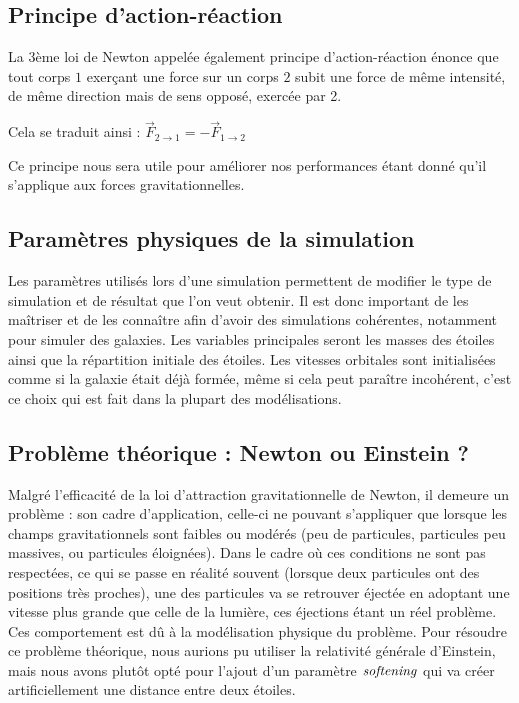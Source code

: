 \vspace{2mm}
\subsection{Principe d'action-réaction}
\vspace{2mm}

La 3ème loi de Newton appelée également principe d'action-réaction énonce que tout corps $1$ exerçant une force sur un corps $2$ subit une force de même intensité, de même direction mais de sens opposé, exercée par 2.

\vspace{2mm}

Cela se traduit ainsi :
$\vec{F}_{2 \rightarrow 1} = -\vec{F}_{1 \rightarrow 2}  $

\vspace{2mm}
Ce principe nous sera utile pour améliorer nos performances étant donné qu'il s'applique aux forces gravitationnelles.


\vspace{3mm}
\subsection{Paramètres physiques de la simulation}
\vspace{2mm}

Les paramètres utilisés lors d'une simulation permettent de modifier le type de simulation et de résultat que l'on veut obtenir. Il est donc important de les maîtriser et de les connaître afin d'avoir des simulations cohérentes, notamment pour simuler des galaxies. Les variables principales seront les masses des étoiles ainsi que la répartition initiale des étoiles. Les vitesses orbitales sont initialisées comme si la galaxie était déjà formée, même si cela peut paraître incohérent, c'est ce choix qui est fait dans la plupart des modélisations.

\vspace{3mm}
\subsection{Problème théorique : Newton ou Einstein ?}
\vspace{2mm}

Malgré l'efficacité de la loi d'attraction gravitationnelle de Newton, il demeure un problème : son cadre d'application, celle-ci ne pouvant s'appliquer que lorsque les champs gravitationnels sont faibles ou modérés (peu de particules, particules peu massives, ou particules éloignées). Dans le cadre où ces conditions ne sont pas respectées, ce qui se passe en réalité souvent (lorsque deux particules ont des positions très proches), une des particules va se retrouver éjectée en adoptant une vitesse plus grande que celle de la lumière, ces éjections étant un réel problème. Ces comportement est dû à la modélisation physique  du problème. Pour résoudre ce problème théorique, nous aurions pu utiliser la relativité générale d'Einstein, mais nous avons plutôt opté pour l'ajout d'un paramètre $\it{softening}$ qui va créer artificiellement une distance entre deux étoiles.

